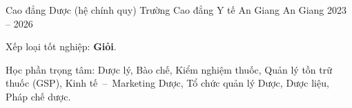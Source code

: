 \begin{cventries}

  \cventry
    {Cao đẳng Dược (hệ chính quy)}
    {Trường Cao đẳng Y tế An Giang}
    {An Giang}
    {2023 -- 2026}
    {
      \begin{cvitems}
        \item {Xếp loại tốt nghiệp: \textbf{Giỏi}.}
        \item {Học phần trọng tâm: Dược lý, Bào chế, Kiểm nghiệm thuốc, Quản lý tồn trữ
               thuốc (GSP), Kinh tế~--~Marketing Dược, Tổ chức quản lý Dược, Dược liệu,
               Pháp chế dược.}
      \end{cvitems}
    }

\end{cventries}
